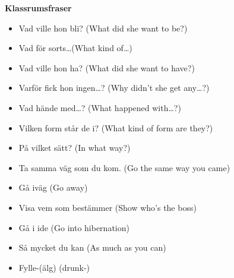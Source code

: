 
\begin{flushleft}
    \textbf{Klassrumsfraser}
    \begin{itemize}
        \item Vad ville hon bli? (What did she want to be?)
        \item Vad för sorts\ldots (What kind of\ldots )
        \item Vad ville hon ha? (What did she want to have?)
        \item Varför fick hon ingen\ldots? (Why didn't she get any\ldots?)
        \item Vad hände med\ldots? (What happened with\ldots?)
        \item Vilken form står de i? (What kind of form are they?)
        \item På vilket sätt? (In what way?)
        \item Ta samma väg som du kom. (Go the same way you came)
        \item Gå iväg (Go away)
        \item Visa vem som bestämmer (Show who's the boss)
        \item Gå i ide (Go into hibernation)
        \item Så mycket du kan (As much as you can)
        \item Fylle-(älg) (drunk-)
    \end{itemize}
\end{flushleft}

